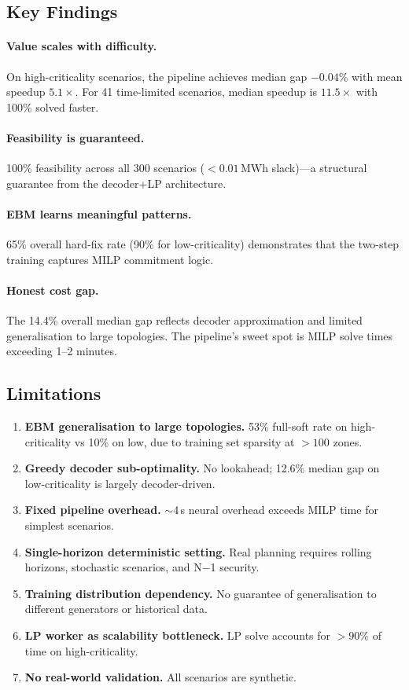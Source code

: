 \documentclass{article}
\begin{document}
\subsection{Key Findings}

\paragraph{Value scales with difficulty.} On high-criticality scenarios, the pipeline achieves median gap $-0.04$\% with mean speedup $5.1\times$. For 41 time-limited scenarios, median speedup is $11.5\times$ with 100\% solved faster.

\paragraph{Feasibility is guaranteed.} 100\% feasibility across all 300 scenarios ($<0.01$\,MWh slack)---a structural guarantee from the decoder+LP architecture.

\paragraph{EBM learns meaningful patterns.} 65\% overall hard-fix rate (90\% for low-criticality) demonstrates that the two-step training captures MILP commitment logic.

\paragraph{Honest cost gap.} The 14.4\% overall median gap reflects decoder approximation and limited generalisation to large topologies. The pipeline's sweet spot is MILP solve times exceeding 1--2 minutes.

\subsection{Limitations}

\begin{enumerate}[label=\textbf{L\arabic*}, leftmargin=*, itemsep=2pt]
  \item \textbf{EBM generalisation to large topologies.} 53\% full-soft rate on high-criticality vs 10\% on low, due to training set sparsity at $>100$ zones.
  \item \textbf{Greedy decoder sub-optimality.} No lookahead; 12.6\% median gap on low-criticality is largely decoder-driven.
  \item \textbf{Fixed pipeline overhead.} $\sim$4\,s neural overhead exceeds MILP time for simplest scenarios.
  \item \textbf{Single-horizon deterministic setting.} Real planning requires rolling horizons, stochastic scenarios, and N$-$1 security.
  \item \textbf{Training distribution dependency.} No guarantee of generalisation to different generators or historical data.
  \item \textbf{LP worker as scalability bottleneck.} LP solve accounts for $>90$\% of time on high-criticality.
  \item \textbf{No real-world validation.} All scenarios are synthetic.
\end{enumerate}
\end{document}
